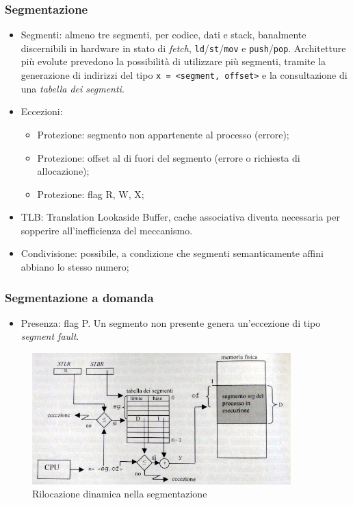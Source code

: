 \documentclass[12pt,a4paper]{article}
\begin{document}
\subsubsection{Segmentazione}
\begin{itemize}
  \item Segmenti: almeno tre segmenti, per codice, dati e stack,
    banalmente discernibili in hardware in stato di \emph{fetch},
    \texttt{ld}/\texttt{st}/\texttt{mov} e \texttt{push}/\texttt{pop}.
    Architetture più evolute prevedono la possibilità di utilizzare
    più segmenti, tramite la generazione di indirizzi del tipo
    \texttt{x = <segment, offset>} e la consultazione di una
    \emph{tabella dei segmenti}.
  \item Eccezioni:
    \begin{itemize}
      \item Protezione: segmento non appartenente al processo (errore);
      \item Protezione: offset al di fuori del segmento (errore o
        richiesta di allocazione);
      \item Protezione: flag R, W, X;
    \end{itemize}
  \item TLB: Translation Lookaside Buffer, cache associativa diventa
    necessaria per sopperire all'inefficienza del meccanismo.
  \item Condivisione: possibile, a condizione che segmenti
    semanticamente affini abbiano lo stesso numero;
\end{itemize}

\subsubsection{Segmentazione a domanda}
\begin{itemize}
  \item Presenza: flag P. Un segmento non presente genera
    un'eccezione di tipo \emph{segment fault}.
\end{itemize}
\begin{figure}[H]
\centering
\includegraphics[width=10cm]{img/mem/trad-segmentazione.png}
\caption{Rilocazione dinamica nella segmentazione}
\end{figure}
\end{document}
